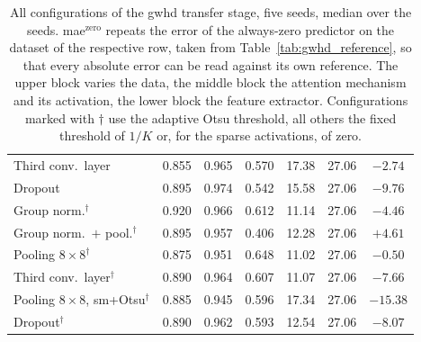 \documentclass[12pt,parskip = half, DIV=classic,listof=totoc]{scrartcl}
\begin{document}
\begin{table}[htbp]
\begin{tabular}{@{}lcccccc@{}}
						Third conv.\ layer       & 0.855 & 0.965 & 0.570 & 17.38 & 27.06 & $-2.74$ \\
						Dropout                  & 0.895 & 0.974 & 0.542 & 15.58 & 27.06 & $-9.76$ \\
						\midrule
						Group norm.$^\dagger$    & 0.920 & 0.966 & 0.612 & 11.14 & 27.06 & $-4.46$ \\
						Group norm.\ $+$ pool.$^\dagger$ & 0.895 & 0.957 & 0.406 & 12.28 & 27.06 & $+4.61$ \\
						Pooling $8\times8^\dagger$ & 0.875 & 0.951 & 0.648 & 11.02 & 27.06 & $-0.50$ \\
						Third conv.\ layer$^\dagger$ & 0.890 & 0.964 & 0.607 & 11.07 & 27.06 & $-7.66$ \\
						Pooling $8\times8$, sm+Otsu$^\dagger$ & 0.885 & 0.945 & 0.596 & 17.34 & 27.06 & $-15.38$ \\
						Dropout$^\dagger$        & 0.890 & 0.962 & 0.593 & 12.54 & 27.06 & $-8.07$ \\
						\bottomrule
					\end{tabular}
					\caption[All configurations of the \acs*{gwhd} transfer stage, five seeds, median over the seeds]{All configurations of the \ac{gwhd} transfer stage, five seeds, median over the seeds.
					\acs*{mae}$^{\text{zero}}$ repeats the error of the always-zero predictor on the dataset of the
					respective row, taken from Table~\ref{tab:gwhd_reference}, so that every absolute error can be
					read against its own reference. The upper block varies the data, the middle block the
					attention mechanism and its activation, the lower block the feature extractor. Configurations
					marked with $\dagger$ use the adaptive Otsu threshold, all others the fixed threshold of $1/K$ or,
					for the sparse activations, of zero.}
					\label{tab:gwhd_results}
				\end{table}
\end{document}
